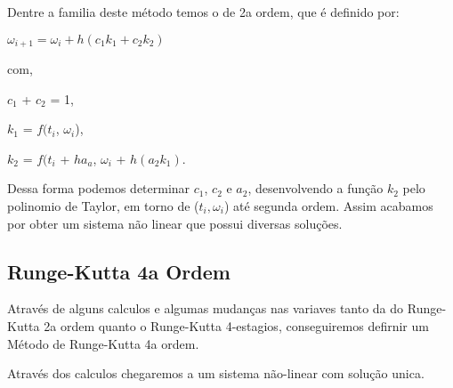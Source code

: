 \documentclass[12pt]{article}
\begin{document}
Dentre a familia deste método temos o de 2a ordem, que é definido por:

$\omega_{i+1} = \omega_{i} + h(c_{1}k_{1} + c_{2}k_{2})$

com,

$c_{1}$ + $c_{2}$ = 1,

$k_{1}$ = $f(t_{i}$, $\omega_{i}$),

$k_{2}$ = $f(t_{i}$ + $ha_{a}$, $\omega_{i}$ + $h(a_{2}k_{1})$.


Dessa forma podemos determinar $c_{1}$, $c_{2}$ e $a_{2}$, desenvolvendo a função $k_{2}$ pelo polinomio de Taylor, em torno de ($t_{i}, \omega_{i}$) até segunda ordem. Assim acabamos por obter um sistema não linear que possui diversas soluções.

\subsection{Runge-Kutta 4a Ordem}
Através de alguns calculos e algumas mudanças nas variaves tanto da do Runge-Kutta 2a ordem quanto o Runge-Kutta 4-estagios, conseguiremos defirnir um Método de Runge-Kutta 4a ordem.

Através dos calculos chegaremos a um sistema não-linear com solução unica.
\end{document}
